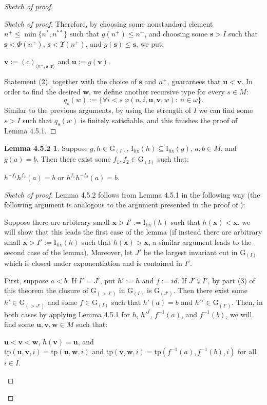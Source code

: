 \documentclass[11pt]{article}
\theoremstyle{plain}
\theoremstyle{definition}
\newcommand{\I}{\mathrm{I_{fix}}}
\newcommand{\G}{\mathrm{G}}
\newcommand{\tp}{\mathrm{tp}}
\begin{document}
\begin{proof}[Sketch of proof]
\begin{proof}[Sketch of proof]
Therefore, by choosing some nonstandard element $n^{+}\leq\min\{n^{*},n^{**}\}$ such that ${g(n^{+})\leq n^{+}}$, and choosing some $\textbf{s}>I$ such that $\textbf{s}<\Phi(n^{+})$, $\textbf{s}<\Upsilon(n^{+})$, and $g(\textbf{s})\leq\textbf{s}$, we put:
\begin{center}
${\textbf{v}:=(c)_{\langle n^{+},\textbf{s},\textbf{r}\rangle}}$ and $\textbf{u}:=g(\textbf{v})$.
\end{center}  
Statement (2), together with the choice of $\mathbf{s}$ and $n^{+}$, guarantees that $\mathbf{u} < \mathbf{v}$. In order to find the desired  $ \textbf{w}$, we define another recursive type for every $s\in M$:
$$q_{s}(w):=\{\forall i<s \ \varphi(n,i,\textbf{u},\textbf{v},w): \ n\in\omega\}. $$ 
Similar to the previous arguments, by using the strength of $I$ we can find some $s>I$ such that $ q_{s}(w)$ is finitely satisfiable, and
this finishes the proof of Lemma 4.5.1.
\end{proof}
\theoremstyle{nonum}
\newtheorem{lemmm}{Lemma 4.5.2}
\theoremstyle{nonum}
\begin{lemmm}
	Suppose $g,h\in\G_{(I)}$, $\I(h)\subseteq\I(g)$, $a,b\in M$, and $g(a)=b$. Then there exist some $f_{1},f_{2}\in\G_{(I)}$ such that: 
	\begin{center}
		$h^{-f_{1}}h^{f_{2}}(a)=b$ or 	$h^{f_{1}}h^{-f_{2}}(a)=b$.
	\end{center}
\end{lemmm}
\begin{proof}[Sketch of proof]
Lemma 4.5.2 follows from Lemma 4.5.1 in the following way (the following argument is analogous to the argument presented in the proof of \cite[Theorem 4.5]{sho2}): 

Suppose there are arbitrary small $\textbf{x}>I':=\I(h)$ such that $h(\textbf{x})<\textbf{x}$. we will show  that this leads the first case of the lemma (if instead there are arbitrary small $\textbf{x}>I':=\I(h)$ such that $h(\textbf{x})>\textbf{x}$, a similar argument leads to the second case of the lemma). Moreover, let $J'$ be the largest invariant cut in $\G_{(I)}$ which is closed under exponentiation and is contained in $I'$.

First, suppose $a<b$.  If   $I'=J'$, put $h':=h$ and $f:=id$. If $J'\subsetneqq I'$, by part (3) of this theorem
 the closure of $\G_{(>J')} $ in $\G_{(I)}$ is $\G_{(J')}$. Then there exist some $h'\in \G_{(>J')}$  and some $f\in\G_{(I)}$ such that $h'(a)=b$ and $h'^{f}\in\G_{(I')}$. Then, in both cases by applying Lemma 4.5.1 for $h$, $h'^{f} $, $f^{-1}(a)$, and $f^{-1}(b)$, we will find some $\textbf{u},\textbf{v},\textbf{w}\in M$ such that:
\begin{center}
	$ \textbf{u}<\textbf{v}<\textbf{w}$, $h(\textbf{v})=\textbf{u}$, and\\ $\tp(\textbf{u},\textbf{v},i)=\tp(\textbf{u},\textbf{w},i)$ and $\tp(\textbf{v},\textbf{w},i)=\tp(f^{-1}(a),f^{-1}(b),i)$ for all $i\in I$.
\end{center} 


\end{proof}
\end{proof}
\end{document}
